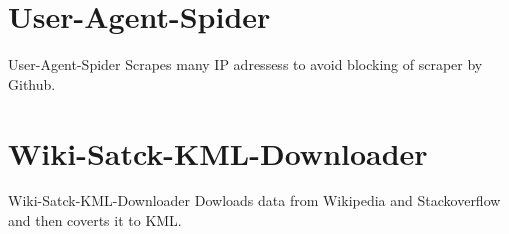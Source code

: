 \documentclass[handout,t]{beamer}
\begin{document}
\section{User-Agent-Spider}
\begin{frame}{User-Agent-Spider}
Scrapes many IP adressess to avoid blocking of scraper by Github.
\end{frame}

\section{Wiki-Satck-KML-Downloader}
\begin{frame}{Wiki-Satck-KML-Downloader}
Dowloads data from Wikipedia and Stackoverflow and then coverts it to KML.
\end{frame}


\end{document}
